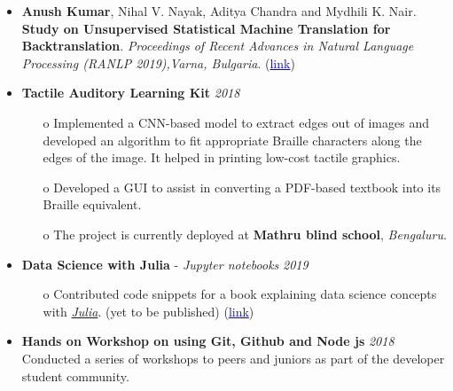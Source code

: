 \documentclass[11pt,a4paper]{article}
\begin{document}
\colorbox{gray}{}
\begin{itemize}
    \item \textbf{Anush Kumar}, Nihal V. Nayak, Aditya Chandra and Mydhili K. Nair. \textbf{Study on Unsupervised Statistical Machine Translation for Backtranslation}. \textit{Proceedings of Recent Advances in Natural Language Processing (RANLP 2019),Varna, Bulgaria}. (\href{https://aclanthology.org/R19-1068/}{\textcolor{blue}{link}}) 
\end{itemize}

\colorbox{gray}{}
\begin{itemize}
    \item \textbf{Tactile Auditory Learning Kit} \hfill \textit{2018}
    \begin{itemize}
        \item[o] Implemented a CNN-based model to extract edges out of images and developed an algorithm to fit appropriate Braille characters along the edges of the image. It helped in printing low-cost tactile graphics.
        \item[o] Developed a GUI to assist in converting a PDF-based textbook into its Braille equivalent. 
        \item[o] The project is currently deployed at \textbf{Mathru blind school}, \emph{Bengaluru}.
    \end{itemize}
    \item \textbf{Data Science with Julia} - \textit{Jupyter notebooks} \hfill \textit{2019}
    \begin{itemize}
        \item[o] Contributed code snippets for a book explaining data science concepts with \href{https://julialang.org}{\emph{Julia}}. (yet to be published) (\href{https://github.com/anushkumarv/Data_Science_with_Julia}{\textcolor{blue}{link}})
    \end{itemize}
\end{itemize}

\colorbox{gray}{}
\begin{itemize}
    \item \textbf{Hands on Workshop on using  Git, Github and Node js} \hfill \textit{2018}
    \\Conducted a series of workshops to peers and juniors as part of the developer student community.
\end{itemize}
\end{document}
